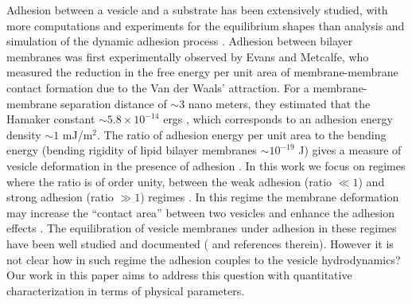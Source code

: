 \documentclass[%
preprint,
 amsmath,amssymb,
 aps,
]{revtex4-1}
\begin{document}
%
Adhesion between a vesicle and a substrate has been extensively studied, with 
more computations and experiments for the equilibrium shapes \cite{Seifert1990_PRA,ShiFengGao2006_ActaMechSin,LinFreund2007_IntJSolidsStructures} than analysis and simulation of
the dynamic adhesion process \cite{BlountMiksisDavis2013_PRSa}.
Adhesion between bilayer membranes was first experimentally observed by Evans and Metcalfe, who measured 
the reduction in the free energy per unit area of membrane-membrane contact formation due to the Van der Waals' attraction. For a membrane-membrane
separation distance of $\sim 3$ nano meters, they estimated that the Hamaker constant $\sim 5.8\times 10^{-14}$ ergs \cite{EvansMetcalfe1984_BJ}, which corresponds to an adhesion energy density $\sim 1$ mJ/m$^2$. The ratio of adhesion energy per unit area to the bending energy (bending rigidity of lipid bilayer membranes $\sim 10^{-19}$ J) gives a measure of vesicle deformation in the presence of adhesion \cite{RamachandranAndersonLealIsraelachvili2010_Langmuir}. In this work we focus on regimes where the ratio is of order unity, between the weak adhesion (ratio $\ll 1$) and strong adhesion (ratio $\gg 1$) regimes \cite{RamachandranAndersonLealIsraelachvili2010_Langmuir}. 
In this regime the membrane deformation may increase the ``contact area'' between two vesicles and enhance the adhesion effects \cite{RamachandranAndersonLealIsraelachvili2010_Langmuir}. The equilibration of vesicle membranes under adhesion in these regimes have been well studied and documented (\cite{RamachandranAndersonLealIsraelachvili2010_Langmuir} and references therein). However it is not clear how in such regime the adhesion couples to the vesicle hydrodynamics? Our work in this paper aims to address this question with quantitative characterization in terms of physical parameters.
\end{document}
